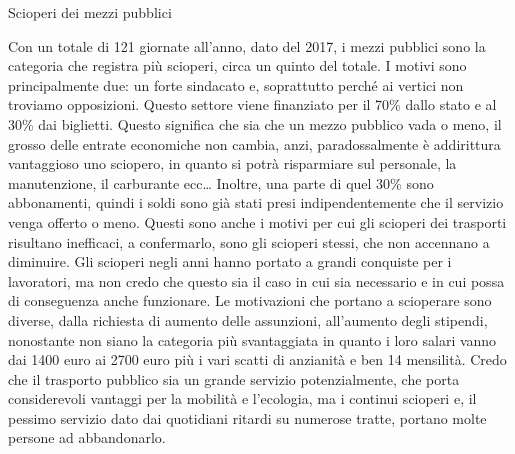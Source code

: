 \documentclass[12pt]{book} %
\begin{document}
\begin{mdframed}[linewidth=1pt]
Scioperi dei mezzi pubblici

Con un totale di 121 giornate all'anno, dato del 2017, i mezzi pubblici sono la categoria che
registra più scioperi, circa un quinto del totale. I motivi sono principalmente due: un forte sindacato e, soprattutto
perché ai vertici non troviamo opposizioni. Questo settore viene finanziato per il 70\% dallo stato e al 30\% dai
biglietti. Questo significa che sia che un mezzo pubblico vada o meno, il grosso delle entrate economiche non cambia,
anzi, paradossalmente è addirittura vantaggioso uno sciopero, in quanto si potrà risparmiare sul personale, la
manutenzione, il carburante ecc… Inoltre, una parte di quel 30\% sono abbonamenti, quindi i soldi sono già stati
presi indipendentemente che il servizio venga offerto o
meno. Questi
sono anche i motivi per cui gli scioperi dei trasporti risultano inefficaci, a confermarlo, sono gli scioperi stessi,
che non accennano a diminuire. Gli scioperi negli anni hanno
portato a grandi conquiste per i lavoratori, ma non credo che questo sia il caso in cui sia necessario e in cui possa
di conseguenza anche funzionare. Le motivazioni che portano a scioperare sono diverse, dalla richiesta di aumento delle
assunzioni, all'aumento degli stipendi, nonostante non siano la categoria più svantaggiata in
quanto i loro salari vanno dai 1400 euro ai 2700 euro più i vari scatti di anzianità
e ben 14 mensilità. Credo che il trasporto pubblico sia
un grande servizio potenzialmente, che porta considerevoli vantaggi per la mobilità e l'ecologia,
ma i continui scioperi e, il pessimo servizio dato dai quotidiani ritardi su numerose tratte, portano molte persone ad abbandonarlo.


\end{mdframed}
\end{document}
